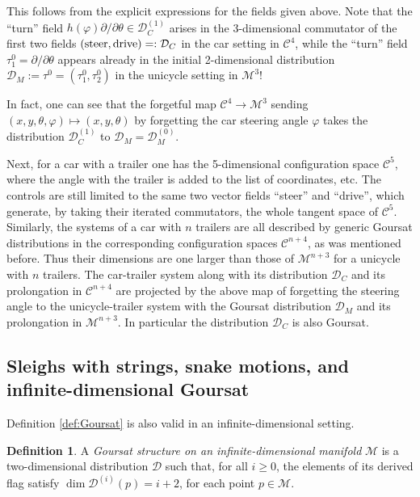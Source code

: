 \documentclass[11pt]{article}
\theoremstyle{definition}
\newtheorem{definition}[lemma]{Definition}
\newcounter{ai}
\begin{document}
This follows from the explicit expressions for the fields given above. 
Note that the ``turn'' field $h(\varphi){\partial}/{\partial \theta}\in\mathcal D_C^{(1)}$ arises in 
the 3-dimensional commutator  of the first two fields $({\rm steer}, {\rm drive})=:\mathcal D_C$ 
in the car setting in $\mathcal C^4$, while the ``turn'' field $\tau^0_1={\partial}/{\partial \theta}$ appears already in the initial  
2-dimensional distribution $\mathcal D_M:=\tau^0=(\tau^0_1,\tau^0_2)$ in the unicycle setting in $\mathcal M^3$!

In fact, one can see that the forgetful map $\mathcal C^4\to \mathcal M^3$ sending 
$(x,y, \theta, \varphi)\mapsto (x,y, \theta)$ by forgetting the car steering angle $\varphi$ takes the distribution
$\mathcal D_C^{(1)}$ to $\mathcal D_M=\mathcal D_M^{(0)}$. 


\bigskip

 Next, for a car with a trailer one has the 5-dimensional configuration space ${\mathcal C}^5$, where the angle with 
 the trailer is added to the list of coordinates, etc.  The controls are still limited to the same two vector fields ``steer'' and ``drive'', 
 which generate,  by taking their iterated commutators, the whole tangent space of 
 ${\mathcal C}^5$. Similarly, the systems of a car with $n$ trailers are all described by generic  Goursat distributions
 in the corresponding configuration spaces ${\mathcal C}^{n+4}$, as was mentioned before. Thus their dimensions are  one larger than those of ${\mathcal M}^{n+3}$ for a unicycle with $n$ trailers.  The car-trailer system along with its distribution $\mathcal D_C$ and its prolongation in ${\mathcal C}^{n+4}$ are projected  by the above map of forgetting the steering angle to the unicycle-trailer system with the Goursat distribution $\mathcal D_M$  and its prolongation in ${\mathcal M}^{n+3}$. In particular the distribution $\mathcal D_C$ is also Goursat.


\subsection{Sleighs with strings, snake motions, and infinite-dimensional Goursat}
\label{sec:snake}

Definition \ref{def:Goursat} is also valid in an infinite-dimensional setting. 

\begin{definition} 
A {\it Goursat structure on an infinite-dimensional manifold} $\mathcal M$  
is a  two-dimensional distribution $\mathcal D$ such that, for all $ i\ge 0$, the elements of its derived flag 
satisfy $\dim \mathcal D^{(i)}(p) = i+2$, for each point $p \in \mathcal M$.
\end{definition}
\end{document}
